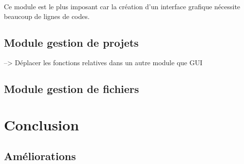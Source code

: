 \documentclass[a4paper,12pt]{article}
\begin{document}
\begin{itemize}
		\end{itemize}
		
		Ce module est le plus imposant car la création d'un interface grafique nécessite beaucoup de lignes de codes.
		
		\subsection{Module gestion de projets}
			--> Déplacer les fonctions relatives dans un autre module que GUI
			
		\subsection{Module gestion de fichiers}	
	
\section{Conclusion}
	
	\subsection{Améliorations}
\end{document}
